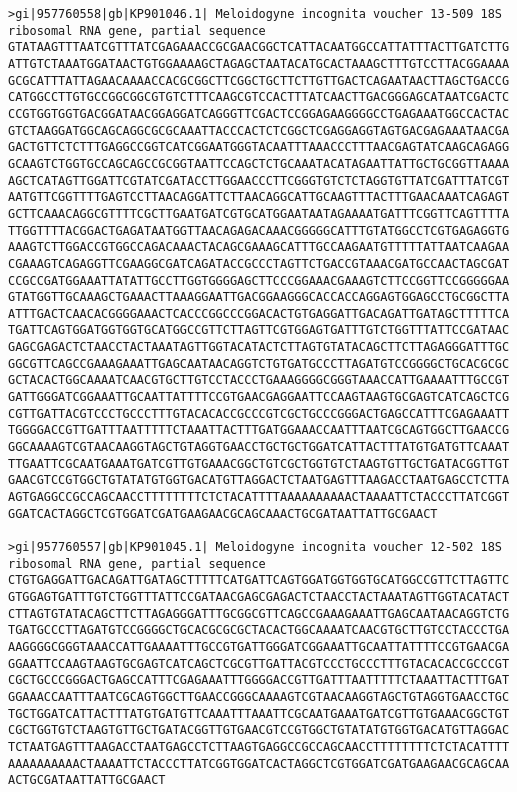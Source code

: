 \documentclass[11pt]{article}
\begin{document}
\begin{Verbatim}[commandchars=\\\{\}]
>gi|957760558|gb|KP901046.1| Meloidogyne incognita voucher 13-509 18S ribosomal RNA gene, partial sequence
GTATAAGTTTAATCGTTTATCGAGAAACCGCGAACGGCTCATTACAATGGCCATTATTTACTTGATCTTG
ATTGTCTAAATGGATAACTGTGGAAAAGCTAGAGCTAATACATGCACTAAAGCTTTGTCCTTACGGAAAA
GCGCATTTATTAGAACAAAACCACGCGGCTTCGGCTGCTTCTTGTTGACTCAGAATAACTTAGCTGACCG
CATGGCCTTGTGCCGGCGGCGTGTCTTTCAAGCGTCCACTTTATCAACTTGACGGGAGCATAATCGACTC
CCGTGGTGGTGACGGATAACGGAGGATCAGGGTTCGACTCCGGAGAAGGGGCCTGAGAAATGGCCACTAC
GTCTAAGGATGGCAGCAGGCGCGCAAATTACCCACTCTCGGCTCGAGGAGGTAGTGACGAGAAATAACGA
GACTGTTCTCTTTGAGGCCGGTCATCGGAATGGGTACAATTTAAACCCTTTAACGAGTATCAAGCAGAGG
GCAAGTCTGGTGCCAGCAGCCGCGGTAATTCCAGCTCTGCAAATACATAGAATTATTGCTGCGGTTAAAA
AGCTCATAGTTGGATTCGTATCGATACCTTGGAACCCTTCGGGTGTCTCTAGGTGTTATCGATTTATCGT
AATGTTCGGTTTTGAGTCCTTAACAGGATTCTTAACAGGCATTGCAAGTTTACTTTGAACAAATCAGAGT
GCTTCAAACAGGCGTTTTCGCTTGAATGATCGTGCATGGAATAATAGAAAATGATTTCGGTTCAGTTTTA
TTGGTTTTACGGACTGAGATAATGGTTAACAGAGACAAACGGGGGCATTTGTATGGCCTCGTGAGAGGTG
AAAGTCTTGGACCGTGGCCAGACAAACTACAGCGAAAGCATTTGCCAAGAATGTTTTTATTAATCAAGAA
CGAAAGTCAGAGGTTCGAAGGCGATCAGATACCGCCCTAGTTCTGACCGTAAACGATGCCAACTAGCGAT
CCGCCGATGGAAATTATATTGCCTTGGTGGGGAGCTTCCCGGAAACGAAAGTCTTCCGGTTCCGGGGGAA
GTATGGTTGCAAAGCTGAAACTTAAAGGAATTGACGGAAGGGCACCACCAGGAGTGGAGCCTGCGGCTTA
ATTTGACTCAACACGGGGAAACTCACCCGGCCCGGACACTGTGAGGATTGACAGATTGATAGCTTTTTCA
TGATTCAGTGGATGGTGGTGCATGGCCGTTCTTAGTTCGTGGAGTGATTTGTCTGGTTTATTCCGATAAC
GAGCGAGACTCTAACCTACTAAATAGTTGGTACATACTCTTAGTGTATACAGCTTCTTAGAGGGATTTGC
GGCGTTCAGCCGAAAGAAATTGAGCAATAACAGGTCTGTGATGCCCTTAGATGTCCGGGGCTGCACGCGC
GCTACACTGGCAAAATCAACGTGCTTGTCCTACCCTGAAAGGGGCGGGTAAACCATTGAAAATTTGCCGT
GATTGGGATCGGAAATTGCAATTATTTTCCGTGAACGAGGAATTCCAAGTAAGTGCGAGTCATCAGCTCG
CGTTGATTACGTCCCTGCCCTTTGTACACACCGCCCGTCGCTGCCCGGGACTGAGCCATTTCGAGAAATT
TGGGGACCGTTGATTTAATTTTTCTAAATTACTTTGATGGAAACCAATTTAATCGCAGTGGCTTGAACCG
GGCAAAAGTCGTAACAAGGTAGCTGTAGGTGAACCTGCTGCTGGATCATTACTTTATGTGATGTTCAAAT
TTGAATTCGCAATGAAATGATCGTTGTGAAACGGCTGTCGCTGGTGTCTAAGTGTTGCTGATACGGTTGT
GAACGTCCGTGGCTGTATATGTGGTGACATGTTAGGACTCTAATGAGTTTAAGACCTAATGAGCCTCTTA
AGTGAGGCCGCCAGCAACCTTTTTTTTCTCTACATTTTAAAAAAAAAACTAAAATTCTACCCTTATCGGT
GGATCACTAGGCTCGTGGATCGATGAAGAACGCAGCAAACTGCGATAATTATTGCGAACT

>gi|957760557|gb|KP901045.1| Meloidogyne incognita voucher 12-502 18S ribosomal RNA gene, partial sequence
CTGTGAGGATTGACAGATTGATAGCTTTTTCATGATTCAGTGGATGGTGGTGCATGGCCGTTCTTAGTTC
GTGGAGTGATTTGTCTGGTTTATTCCGATAACGAGCGAGACTCTAACCTACTAAATAGTTGGTACATACT
CTTAGTGTATACAGCTTCTTAGAGGGATTTGCGGCGTTCAGCCGAAAGAAATTGAGCAATAACAGGTCTG
TGATGCCCTTAGATGTCCGGGGCTGCACGCGCGCTACACTGGCAAAATCAACGTGCTTGTCCTACCCTGA
AAGGGGCGGGTAAACCATTGAAAATTTGCCGTGATTGGGATCGGAAATTGCAATTATTTTCCGTGAACGA
GGAATTCCAAGTAAGTGCGAGTCATCAGCTCGCGTTGATTACGTCCCTGCCCTTTGTACACACCGCCCGT
CGCTGCCCGGGACTGAGCCATTTCGAGAAATTTGGGGACCGTTGATTTAATTTTTCTAAATTACTTTGAT
GGAAACCAATTTAATCGCAGTGGCTTGAACCGGGCAAAAGTCGTAACAAGGTAGCTGTAGGTGAACCTGC
TGCTGGATCATTACTTTATGTGATGTTCAAATTTAAATTCGCAATGAAATGATCGTTGTGAAACGGCTGT
CGCTGGTGTCTAAGTGTTGCTGATACGGTTGTGAACGTCCGTGGCTGTATATGTGGTGACATGTTAGGAC
TCTAATGAGTTTAAGACCTAATGAGCCTCTTAAGTGAGGCCGCCAGCAACCTTTTTTTTCTCTACATTTT
AAAAAAAAAACTAAAATTCTACCCTTATCGGTGGATCACTAGGCTCGTGGATCGATGAAGAACGCAGCAA
ACTGCGATAATTATTGCGAACT


\end{Verbatim}
\end{document}
